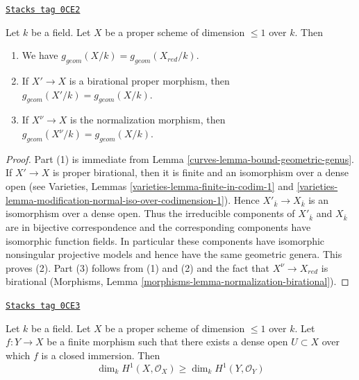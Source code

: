 \begin{lemma}
\label{curves-lemma-geometric-genus-normalization}
\href{https://stacks.math.columbia.edu/tag/0CE2}{\texttt{Stacks tag 0CE2}}

Let $k$ be a field. Let $X$ be a proper scheme of dimension $\leq 1$ over $k$.
Then
\begin{enumerate}
\item We have $g_{geom}(X/k) = g_{geom}(X_{red}/k)$.
\item If $X' \to X$ is a birational proper morphism, then
$g_{geom}(X'/k) = g_{geom}(X/k)$.
\item If $X^\nu \to X$ is the normalization morphism, then
$g_{geom}(X^\nu/k) = g_{geom}(X/k)$.
\end{enumerate}
\end{lemma}

\begin{proof}

Part (1) is immediate from Lemma \ref{curves-lemma-bound-geometric-genus}.
If $X' \to X$ is proper birational, then it is finite and
an isomorphism over a dense open (see
Varieties, Lemmas \ref{varieties-lemma-finite-in-codim-1} and
\ref{varieties-lemma-modification-normal-iso-over-codimension-1}).
Hence $X'_{\overline{k}} \to X_{\overline{k}}$ is an isomorphism
over a dense open. Thus the irreducible components of $X'_{\overline{k}}$
and $X_{\overline{k}}$ are in bijective correspondence and the
corresponding components have isomorphic function fields.
In particular these components have isomorphic nonsingular projective models
and hence have the same geometric genera.
This proves (2).
Part (3) follows from (1) and (2) and the fact that
$X^\nu \to X_{red}$ is birational
(Morphisms, Lemma \ref{morphisms-lemma-normalization-birational}).
\end{proof}

\begin{lemma}
\label{curves-lemma-genus-goes-down}
\href{https://stacks.math.columbia.edu/tag/0CE3}{\texttt{Stacks tag 0CE3}}

Let $k$ be a field. Let $X$ be a proper scheme of dimension
$\leq 1$ over $k$. Let $f : Y \to X$ be a finite morphism
such that there exists a dense open $U \subset X$ over
which $f$ is a closed immersion. Then
$$
\dim_k H^1(X, \mathcal{O}_X) \geq \dim_k H^1(Y, \mathcal{O}_Y)
$$
\end{lemma}

